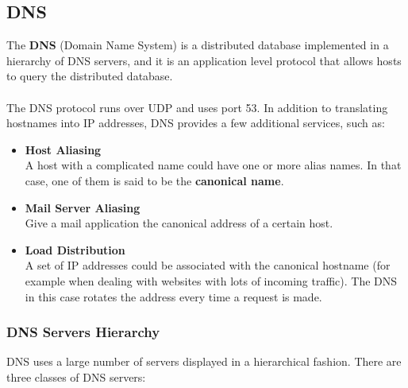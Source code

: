 \documentclass{article}
\begin{document}
\subsection{DNS}
The \textbf{DNS} (Domain Name System) is a distributed database implemented in a hierarchy of DNS servers, and it is an application level protocol that allows hosts to query the distributed database. \\ \\
The DNS protocol runs over UDP and uses port 53. In addition to translating hostnames into IP addresses, DNS provides a few additional services, such as:

\begin{itemize}
	\item \textbf{Host Aliasing}
	\vspace{.2cm} \\
	A host with a complicated name could have one or more alias names. In that case, one of them is said to be the \textbf{canonical name}.
	\item \textbf{Mail Server Aliasing}
	\vspace{.2cm} \\
	Give a mail application the canonical address of a certain host.
	\item \textbf{Load Distribution}
	\vspace{.2cm} \\
	A set of IP addresses could be associated with the canonical hostname (for example when dealing with websites with lots of incoming traffic). The DNS in this case rotates the address every time a request is made.
\end{itemize}

\subsubsection{DNS Servers Hierarchy}
DNS uses a large number of servers displayed in a hierarchical fashion. There are three classes of DNS servers:
\end{document}
